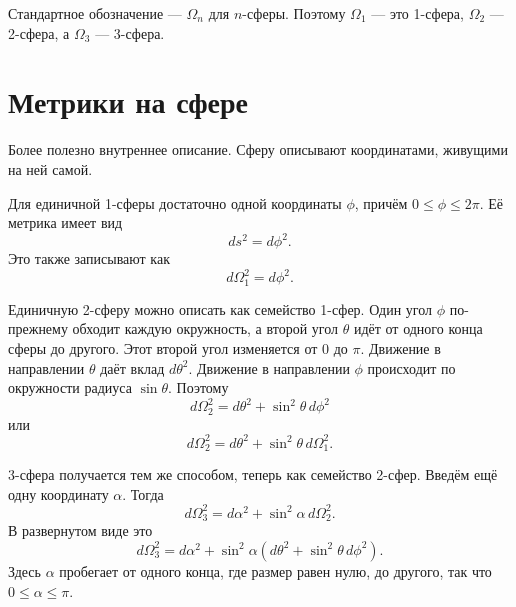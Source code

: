 Стандартное обозначение — \(\Omega_n\) для \(n\)-сферы. Поэтому \(\Omega_1\) — это 1-сфера, \(\Omega_2\) — 2-сфера, а \(\Omega_3\) — 3-сфера.

\section{Метрики на сфере}

Более полезно внутреннее описание. Сферу описывают координатами, живущими на ней самой.

Для единичной 1-сферы достаточно одной координаты \(\phi\), причём \(0\leq \phi \leq 2\pi\). Её метрика имеет вид
\begin{equation}
ds^2=d\phi^2.
\end{equation}
Это также записывают как
\begin{equation}
d\Omega_1^2=d\phi^2.
\end{equation}

Единичную 2-сферу можно описать как семейство 1-сфер. Один угол \(\phi\) по-прежнему обходит каждую окружность, а второй угол \(\theta\) идёт от одного конца сферы до другого. Этот второй угол изменяется от \(0\) до \(\pi\). Движение в направлении \(\theta\) даёт вклад \(d\theta^2\). Движение в направлении \(\phi\) происходит по окружности радиуса \(\sin\theta\). Поэтому
\begin{equation}
d\Omega_2^2=d\theta^2+\sin^2\theta\,d\phi^2
\end{equation}
или
\begin{equation}
d\Omega_2^2=d\theta^2+\sin^2\theta\,d\Omega_1^2.
\end{equation}

3-сфера получается тем же способом, теперь как семейство 2-сфер. Введём ещё одну координату \(\alpha\). Тогда
\begin{equation}
d\Omega_3^2=d\alpha^2+\sin^2\alpha\,d\Omega_2^2.
\end{equation}
В развернутом виде это
\begin{equation}
d\Omega_3^2=d\alpha^2+\sin^2\alpha\left(d\theta^2+\sin^2\theta\,d\phi^2\right).
\end{equation}
Здесь \(\alpha\) пробегает от одного конца, где размер равен нулю, до другого, так что \(0\leq \alpha \leq \pi\).

